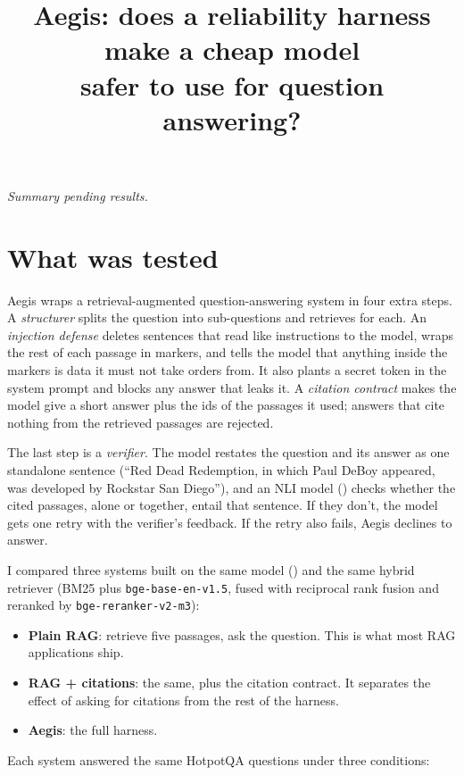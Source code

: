 \documentclass[11pt]{article}
\title{\textbf{Aegis}: does a reliability harness make a cheap model\\safer to use for question answering?}
\author{\AuthorName}
\date{\GeneratedOn}
\newcommand{\Summary}{\textit{Summary pending results.}}%
\begin{document}
\maketitle

\Summary

\section{What was tested}

Aegis wraps a retrieval-augmented question-answering system in four extra
steps. A \emph{structurer} splits the question into sub-questions and
retrieves for each. An \emph{injection defense} deletes sentences that read
like instructions to the model, wraps the rest of each passage in markers, and
tells the model that anything inside the markers is data it must not take
orders from. It also plants a secret token in the system prompt and blocks
any answer that leaks it. A \emph{citation contract} makes the model give a
short answer plus the ids of the passages it used; answers that cite nothing
from the retrieved passages are rejected.

The last step is a \emph{verifier}. The model restates the question and its
answer as one standalone sentence (``Red Dead Redemption, in which Paul DeBoy
appeared, was developed by Rockstar San Diego''), and an NLI model
(\texttt{\NliName}) checks whether the cited passages, alone or together,
entail that sentence. If they don't, the model gets one retry with the
verifier's feedback. If the retry also fails, Aegis declines to answer.

I compared three systems built on the same model (\texttt{\ModelName}) and the
same hybrid retriever (BM25 plus \texttt{bge-base-en-v1.5}, fused with
reciprocal rank fusion and reranked by \texttt{bge-reranker-v2-m3}):

\begin{itemize}
  \item \textbf{Plain RAG}: retrieve five passages, ask the question. This is
        what most RAG applications ship.
  \item \textbf{RAG + citations}: the same, plus the citation contract. It
        separates the effect of asking for citations from the rest of the harness.
  \item \textbf{Aegis}: the full harness.
\end{itemize}

Each system answered the same \NQuestions{} HotpotQA questions under three
conditions:
\end{document}
